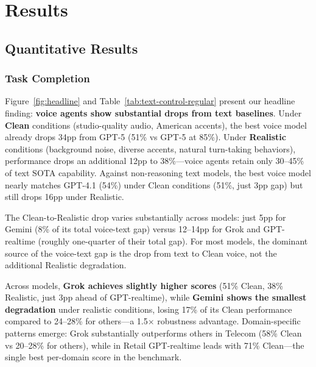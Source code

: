 \section{Results}
\label{sec:results}

\subsection{Quantitative Results}

\subsubsection{Task Completion}

Figure~\ref{fig:headline} and Table~\ref{tab:text-control-regular} present our headline finding: \textbf{voice agents show substantial drops from text baselines}. Under \textbf{Clean} conditions (studio-quality audio, American accents), the best voice model already drops 34pp from GPT-5 (51\% vs GPT-5 at 85\%). Under \textbf{Realistic} conditions (background noise, diverse accents, natural turn-taking behaviors), performance drops an additional 12pp to 38\%---voice agents retain only 30--45\% of text SOTA capability. Against non-reasoning text models, the best voice model nearly matches GPT-4.1 (54\%) under Clean conditions (51\%, just 3pp gap) but still drops 16pp under Realistic.

\begin{table}[h]
\caption{Text vs Voice comparison (pass@1). Text shows GPT-5 (reasoning) and GPT-4.1 (non-reasoning). Voice evaluated under Clean and Realistic conditions. Deltas show gap from GPT-5.}
\label{tab:text-control-regular}
\centering
\begin{small}
\resizebox{\columnwidth}{!}{%

}
\end{small}
\end{table}

The Clean-to-Realistic drop varies substantially across models: just 5pp for Gemini (8\% of its total voice-text gap) versus 12--14pp for Grok and GPT-realtime (roughly one-quarter of their total gap). For most models, the dominant source of the voice-text gap is the drop from text to Clean voice, not the additional Realistic degradation.


Across models, \textbf{Grok achieves slightly higher scores} (51\% Clean, 38\% Realistic, just 3pp ahead of GPT-realtime), while \textbf{Gemini shows the smallest degradation} under realistic conditions, losing 17\% of its Clean performance compared to 24--28\% for others---a 1.5$\times$ robustness advantage. Domain-specific patterns emerge: Grok substantially outperforms others in Telecom (58\% Clean vs 20--28\% for others), while in Retail GPT-realtime leads with 71\% Clean---the single best per-domain score in the benchmark.

